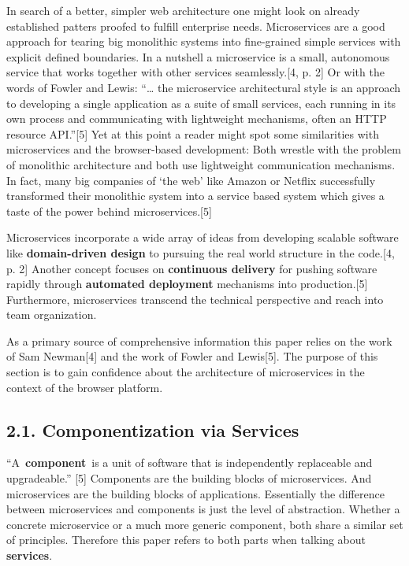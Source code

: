 \documentclass[]{article}
\begin{document}
In search of a better, simpler web architecture one might look on
already established patters proofed to fulfill enterprise needs.
Microservices are a good approach for tearing big monolithic systems
into fine-grained simple services with explicit defined boundaries. In a
nutshell a microservice is a small, autonomous service that works
together with other services seamlessly.{[}4, p. 2{]} Or with the words
of Fowler and Lewis: ``\ldots{} the microservice architectural style is
an approach to developing a single application as a suite of small
services, each running in its own process and communicating with
lightweight mechanisms, often an HTTP resource API.''{[}5{]} Yet at this
point a reader might spot some similarities with microservices and the
browser-based development: Both wrestle with the problem of monolithic
architecture and both use lightweight communication mechanisms. In fact,
many big companies of `the web' like Amazon or Netflix successfully
transformed their monolithic system into a service based system which
gives a taste of the power behind microservices.{[}5{]}

Microservices incorporate a wide array of ideas from developing scalable
software like \textbf{domain-driven design} to pursuing the real world
structure in the code.{[}4, p. 2{]} Another concept focuses on
\textbf{continuous delivery} for pushing software rapidly through
\textbf{automated deployment} mechanisms into production.{[}5{]}
Furthermore, microservices transcend the technical perspective and reach
into team organization.

As a primary source of comprehensive information this paper relies on
the work of Sam Newman{[}4{]} and the work of Fowler and Lewis{[}5{]}.
The purpose of this section is to gain confidence about the architecture
of microservices in the context of the browser platform.

\subsection{2.1. Componentization via
Services}\label{componentization-via-services}

``A~\textbf{component}~is a unit of software that is independently
replaceable and upgradeable.'' {[}5{]} Components are the building
blocks of microservices. And microservices are the building blocks of
applications. Essentially the difference between microservices and
components is just the level of abstraction. Whether a concrete
microservice or a much more generic component, both share a similar set
of principles. Therefore this paper refers to both parts when talking
about \textbf{services}.
\end{document}
